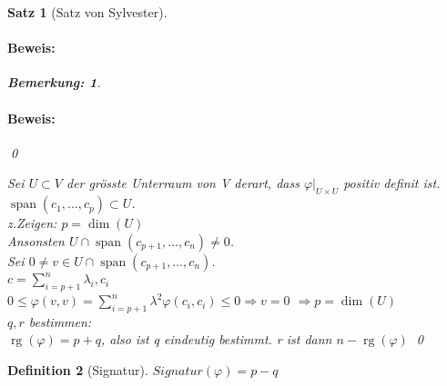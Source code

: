 \documentclass{report}
\newcommand{\lb}{\lambda}
\DeclareMathOperator{\Span}{span}
\DeclareMathOperator{\rg}{rg}
\theoremstyle{customrem}
\newtheorem*{bemerkung}{Bemerkung\textnormal:}
\theoremstyle{customdef}
\newtheorem{definition}{Definition}[chapter]
\newtheorem{satz}[definition]{Satz}
\renewenvironment{proof}{\paragraph{Beweis: }}{\qed}
\theoremstyle{customenv}
\begin{document}
\begin{satz}[Satz von Sylvester]
\begin{proof}
\begin{bemerkung}
\begin{proof}
      \end{proof}
    \end{bemerkung}
    Sei \(U \subset V\) der gr\"osste Unterraum von V derart, dass
    \(\varphi|_{U \times U}\) positiv definit ist.\\
    \(\Span(c_1, \dots, c_p) \subset U\).\\
    z.Zeigen: \(p = \dim(U)\)\\
    Ansonsten \(U \cap \Span(c_{p+1}, \dots, c_n) \neq 0\).\\
    Sei \(0 \neq v \in U \cap \Span(c_{p+1}, \dots, c_n)\).\\
    \(c = \sum_{i=p+1}^n \lb_i, c_i\)\\
    \(0 \le \varphi(v, v) = \sum_{i=p+1}^n \lb^2 \varphi(c_i, c_i) \le 0
    \Rightarrow v = 0\)
    \(\Rightarrow p = \dim(U)\)\\
    \(q, r\) bestimmen:\\
    \(\rg(\varphi) = p + q\), also ist q eindeutig bestimmt. r ist dann
    \(n - \rg(\varphi)\)
    \end{proof}
\end{satz}

\begin{definition}[Signatur]
  \(Signatur(\varphi) = p - q\)
\end{definition}

\newpage
\renewcommand{\listtheoremname}{Satz- und Definitionsverzeichnis}
\newpage
\printindex
\end{document}
